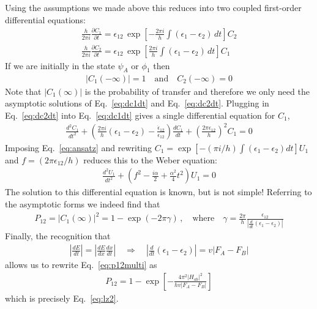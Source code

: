 Using the assumptions we made above this reduces into two coupled first-order differential equations:
\begin{align}
    \frac{h}{2\pi i} \frac{\partial C_1}{\partial t} = \epsilon_{12} \, \exp \left[ - \frac{2\pi i}{h} \int (\epsilon_1 - \epsilon_2) \, dt \right] C_2 \label{eq:dc1dt} \\
    \frac{h}{2\pi i} \frac{\partial C_2}{\partial t} = \epsilon_{12} \, \exp \left[ \frac{2\pi i}{h} \int (\epsilon_1 - \epsilon_2) \, dt \right] C_1 \label{eq:dc2dt}
\end{align}
If we are initially in the state $\psi_A$ or $\phi_1$ then
\begin{align}
    |C_1(-\infty)|=1 \quad \text{and} \quad C_2(-\infty)=0
\end{align}
Note that $|C_1(\infty)|$ is the probability of transfer and therefore we only need the asymptotic solutions of Eq.~\ref{eq:dc1dt} and Eq.~\ref{eq:dc2dt}. Plugging in Eq.~\ref{eq:dc2dt} into Eq.~\ref{eq:dc1dt} gives a single differential equation for $C_1$,
\begin{align}
    \frac{d^2C_1}{dt^2}
    + \left(
        \frac{2\pi i}{h} (\epsilon_1 - \epsilon_2) - \frac{ \dot{\epsilon}_{12} }{ \epsilon_{12} }
    \right) \frac{dC_1}{dt}
    + \left( \frac{2\pi \epsilon_{12}}{h} \right)^2 C_1
    = 0
\end{align}
Imposing Eq.~\ref{eq:ansatz} and rewriting $C_1 = \exp [ -(\pi i/h) \int (\epsilon_1 - \epsilon_2) dt] U_1$ and $f=(2\pi \epsilon_{12}/h)$ reduces this to the Weber equation:
\begin{align}
    \frac{d^2U_1}{dt^2} + \left( f^2 - \frac{i\alpha}{2} + \frac{\alpha^2}{4} t^2 \right) U_1 = 0
\end{align}
The solution to this differential equation is known, but is not simple! Referring to the asymptotic forms we indeed find that
\begin{align}
    P_{12} = |C_1(\infty)|^2 = 1 - \exp (-2\pi\gamma)\, , \quad \text{where} \quad \gamma = \frac{2\pi}{h} \frac{\epsilon_{12}}{|\frac{d}{dt}(\epsilon_1-\epsilon_2)|}
    \label{eq:p12multi}
\end{align}
Finally, the recognition that
\begin{align}
    \left| \frac{dE}{dt} \right| =
    \left| \frac{dE}{dx}\frac{dx}{dt} \right|
    \quad \Rightarrow \quad
    \left| \frac{d}{dt} (\epsilon_1 - \epsilon_2)\right| =
    v |F_A - F_B|
\end{align}
allows us to rewrite Eq.~\ref{eq:p12multi} as
\begin{align}
    P_{12} = 1 - \exp \left[ - \frac{4\pi^2 |H_{ab}|^2}{hv |F_A - F_B|} \right]
\end{align}
which is precisely Eq.~\ref{eq:lz2}.
